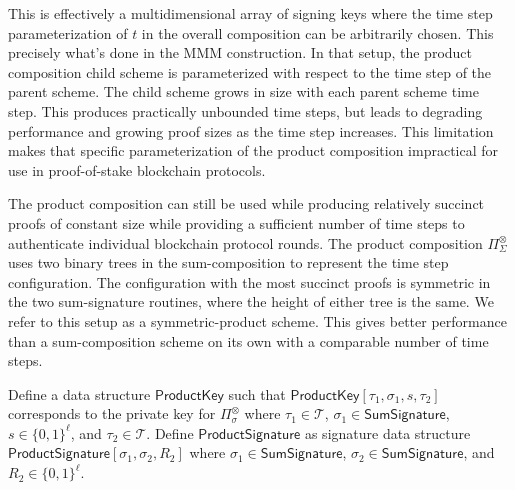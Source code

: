 \documentclass{article}
\begin{document}
This is effectively a multidimensional array of signing keys where the time step parameterization of $t$ in the overall composition can be arbitrarily chosen.  This precisely what's done in the MMM construction. 
In that setup, the product composition child scheme is parameterized with respect to the time step of the parent scheme.  
The child scheme grows in size with each parent scheme time step.  
This produces practically unbounded time steps, but leads to degrading performance and growing proof sizes as the time step increases.  This limitation makes that specific parameterization of the product composition impractical for use in proof-of-stake blockchain protocols.

The product composition can still be used while producing relatively succinct proofs of constant size while providing a sufficient number of time steps to authenticate individual blockchain protocol rounds. The product composition $\Pi_\Sigma^\otimes$ uses two binary trees in the sum-composition to represent the time step configuration. 
The configuration with the most succinct proofs is symmetric in the two sum-signature routines, where the height of either tree is the same.  We refer to this setup as a symmetric-product scheme.
This gives better performance than a sum-composition scheme on its own with a comparable number of time steps. 

Define a data structure { $\mathsf{ProductKey}$\label{def:ProductKey}} such that $\mathsf{\hyperref[def:ProductKey]{ProductKey}}[\tau_1,\sigma_1,s,\tau_2]$ corresponds to the private key for $\Pi_\sigma^\otimes$ where $\tau_1 \in \mathcal{T}$,
$\sigma_1 \in \mathsf{\hyperref[def:SumSignature]{SumSignature}}$, 
$s\in\{0,1\}^\ell$, and $\tau_2\in\mathcal{T}$. 
 Define {$\mathsf{ProductSignature}$\label{def:ProductSignature}} as signature data structure\newline $\mathsf{\hyperref[def:ProductSignature]{ProductSignature}}[\sigma_1,\sigma_2,R_2]$ where $\sigma_1\in\mathsf{\hyperref[def:SumSignature]{SumSignature}}$, $\sigma_2\in\mathsf{\hyperref[def:SumSignature]{SumSignature}}$, and $R_2\in\{0,1\}^\ell$.
\end{document}
